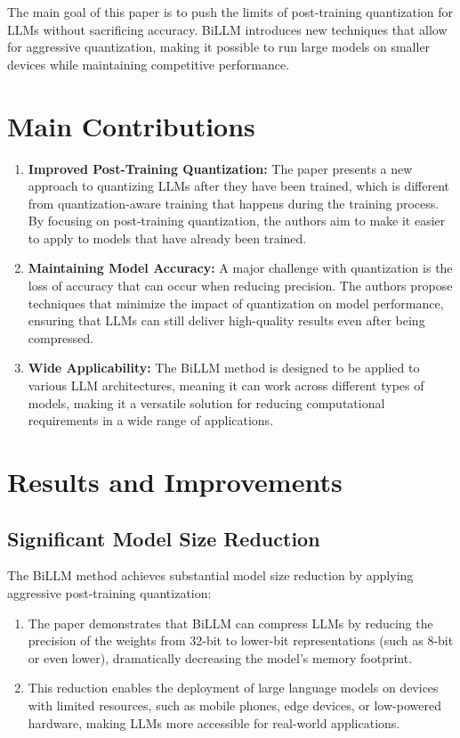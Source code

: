 \documentclass{report}
\begin{document}
	The main goal of this paper is to push the limits of post-training quantization for LLMs without sacrificing accuracy. BiLLM introduces new techniques that allow for aggressive quantization, making it possible to run large models on smaller devices while maintaining competitive performance.
	
	\section{Main Contributions}
	\begin{enumerate}
		\item 
		\textbf{Improved Post-Training Quantization:} The paper presents a new approach to quantizing LLMs after they have been trained, which is different from quantization-aware training that happens during the training process. By focusing on post-training quantization, the authors aim to make it easier to apply to models that have already been trained.
		
		\item 
		\textbf{Maintaining Model Accuracy:} A major challenge with quantization is the loss of accuracy that can occur when reducing precision. The authors propose techniques that minimize the impact of quantization on model performance, ensuring that LLMs can still deliver high-quality results even after being compressed.
		
		\item 
		\textbf{Wide Applicability:} The BiLLM method is designed to be applied to various LLM architectures, meaning it can work across different types of models, making it a versatile solution for reducing computational requirements in a wide range of applications.
	\end{enumerate}
	
	
	
	
	
	\section{Results and Improvements}
	\subsection{Significant Model Size Reduction}
	The BiLLM method achieves substantial model size reduction by applying aggressive post-training quantization:
	\begin{enumerate}
		\item 
		The paper demonstrates that BiLLM can compress LLMs by reducing the precision of the weights from 32-bit to lower-bit representations (such as 8-bit or even lower), dramatically decreasing the model's memory footprint.
		
		\item 
		This reduction enables the deployment of large language models on devices with limited resources, such as mobile phones, edge devices, or low-powered hardware, making LLMs more accessible for real-world applications.
	\end{enumerate}
	
\end{document}

